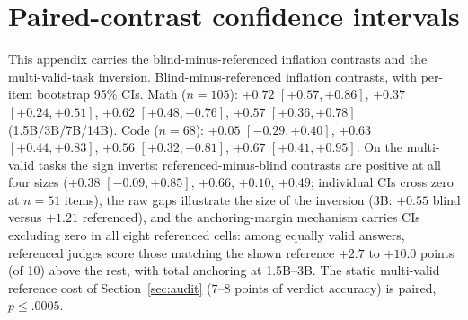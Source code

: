 \section{Paired-contrast confidence intervals}
\label{app:cis}
This appendix carries the blind-minus-referenced inflation contrasts and the multi-valid-task inversion.
Blind-minus-referenced inflation contrasts, with per-item bootstrap 95\% CIs.
Math ($n{=}105$): $+0.72$ $[+0.57,+0.86]$, $+0.37$ $[+0.24,+0.51]$, $+0.62$ $[+0.48,+0.76]$, $+0.57$ $[+0.36,+0.78]$ (1.5B/3B/7B/14B).
Code ($n{=}68$): $+0.05$ $[-0.29,+0.40]$, $+0.63$ $[+0.44,+0.83]$, $+0.56$ $[+0.32,+0.81]$, $+0.67$ $[+0.41,+0.95]$.
On the multi-valid tasks the sign inverts: referenced-minus-blind contrasts are positive at all four sizes ($+0.38$ $[-0.09, +0.85]$, $+0.66$, $+0.10$, $+0.49$; individual CIs cross zero at $n{=}51$ items), the raw gaps illustrate the size of the inversion (3B: $+0.55$ blind versus $+1.21$ referenced), and the anchoring-margin mechanism carries CIs excluding zero in all eight referenced cells: among equally valid answers, referenced judges score those matching the shown reference $+2.7$ to $+10.0$ points (of 10) above the rest, with total anchoring at 1.5B--3B.
The static multi-valid reference cost of Section~\ref{sec:audit} ($7$--$8$ points of verdict accuracy) is paired, $p \le .0005$.
